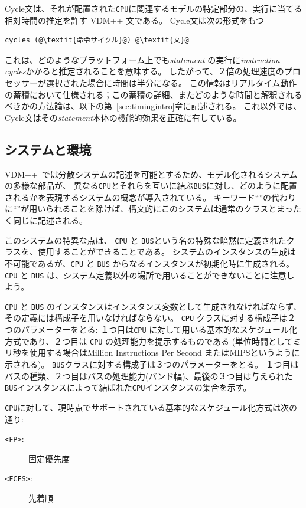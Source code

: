 \documentclass[\pformat,12pt]{jreport}
\newcommand{\vdmpp}{VDM++} %
\begin{document}
Cycle文は、それが配置された\texttt{CPU}に関連するモデルの特定部分の、実行に当てる相対時間の推定を許す VDM++ 文である。
Cycle文は次の形式をもつ

\begin{lstlisting}
cycles (@\textit{命令サイクル}@) @\textit{文}@
\end{lstlisting}

これは、どのようなプラットフォーム上でも\emph{statement} の実行に\emph{instruction cycles}かかると推定されることを意味する。
したがって、２倍の処理速度のプロセッサーが選択された場合に時間は半分になる。
この情報はリアルタイム動作の蓄積において仕様される；この蓄積の詳細、またどのような時間と解釈されるべきかの方法論は、以下の第~\ref{sec:timingintro}章に記述される。
これ以外では、Cycle文はその\textit{statement}本体の機能的効果を正確に有している。

\subsection{システムと環境}

\vdmpp\ では分散システムの記述を可能とするため、モデル化されるシステムの多様な部品が、 
異なる\texttt{CPU}とそれらを互いに結ぶ\texttt{BUS}に対し、どのように配置されるかを表現するシステムの概念が導入されている。
キーワード``''の代わりに``''が用いられることを除けば、構文的にこのシステムは通常のクラスとまったく同じに記述される。

このシステムの特異な点は、 \texttt{CPU} と \texttt{BUS}という名の特殊な暗黙に定義されたクラスを、使用することができることである。
システムのインスタンスの生成は不可能であるが、\texttt{CPU} と \texttt{BUS} からなるインスタンスが初期化時に生成される。
 \texttt{CPU} と \texttt{BUS} は、システム定義以外の場所で用いることができないことに注意しよう。

\texttt{CPU} と \texttt{BUS} のインスタンスはインスタンス変数として生成されなければならず、その定義には構成子を用いなければならない。
\texttt{CPU} クラスに対する構成子は２つのパラメーターをとる: １つ目は\texttt{CPU} に対して用いる基本的なスケジュール化方式であり、２つ目は \texttt{CPU} の処理能力を提示するものである (単位時間としてミリ秒を使用する場合はMillion Instructions Per Second またはMIPSというように示される)。 
\texttt{BUS}クラスに対する構成子は３つのパラメーターをとる。
１つ目はバスの種類、２つ目はバスの処理能力(バンド幅)、最後の３つ目は与えられた \texttt{BUS}インスタンスによって結ばれた\texttt{CPU}インスタンスの集合を示す。

\texttt{CPU}に対して、現時点でサポートされている基本的なスケジュール化方式は次の通り:
\begin{description}
\item[\texttt{<FP>}:] 固定優先度
\item[\texttt{<FCFS>}:] 先着順
\end{description} 
\end{document}
